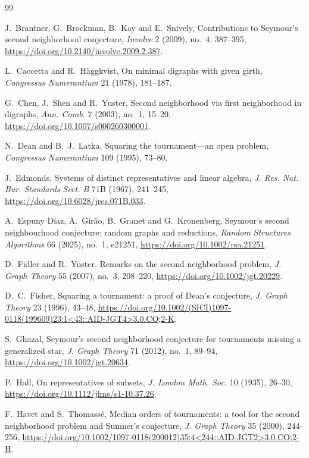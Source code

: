 \documentclass[11pt]{amsart}
\theoremstyle{remark}
\begin{document}
\begin{thebibliography}{99}
\raggedright
{}
J.~Brantner, G.~Brockman, B.~Kay and E.~Snively, Contributions to Seymour's
second neighborhood conjecture, \emph{Involve} 2 (2009), no.~4, 387--395,
\url{https://doi.org/10.2140/involve.2009.2.387}.

L.~Caccetta and R.~H\"aggkvist, On minimal digraphs with given girth,
\emph{Congressus Numerantium} 21 (1978), 181--187.

G.~Chen, J.~Shen and R.~Yuster, Second neighborhood via first neighborhood
in digraphs, \emph{Ann. Comb.} 7 (2003), no.~1, 15--20,
\url{https://doi.org/10.1007/s000260300001}.

N.~Dean and B.~J.~Latka, Squaring the tournament---an open problem,
\emph{Congressus Numerantium} 109 (1995), 73--80.

J.~Edmonds, Systems of distinct representatives and linear algebra,
\emph{J. Res. Nat. Bur. Standards Sect. B} 71B (1967), 241--245,
\url{https://doi.org/10.6028/jres.071B.033}.

A.~Espuny D\'iaz, A.~Gir\~ao, B.~Granet and G.~Kronenberg, Seymour's second
neighbourhood conjecture: random graphs and reductions, \emph{Random
Structures Algorithms} 66 (2025), no.~1, e21251,
\url{https://doi.org/10.1002/rsa.21251}.

D.~Fidler and R.~Yuster, Remarks on the second neighborhood problem,
\emph{J. Graph Theory} 55 (2007), no.~3, 208--220,
\url{https://doi.org/10.1002/jgt.20229}.

D.~C.~Fisher, Squaring a tournament: a proof of Dean's conjecture,
\emph{J. Graph Theory} 23 (1996), 43--48,
\url{https://doi.org/10.1002/(SICI)1097-0118(199609)23:1<43::AID-JGT4>3.0.CO;2-K}.

S.~Ghazal, Seymour's second neighborhood conjecture for tournaments
missing a generalized star, \emph{J. Graph Theory} 71 (2012), no.~1, 89--94,
\url{https://doi.org/10.1002/jgt.20634}.

P.~Hall, On representatives of subsets,
\emph{J. London Math. Soc.} 10 (1935), 26--30,
\url{https://doi.org/10.1112/jlms/s1-10.37.26}.

F.~Havet and S.~Thomass\'e, Median orders of tournaments: a tool for the
second neighborhood problem and Sumner's conjecture,
\emph{J. Graph Theory} 35 (2000), 244--256,
\url{https://doi.org/10.1002/1097-0118(200012)35:4<244::AID-JGT2>3.0.CO;2-H}.


\end{thebibliography}
\end{document}
